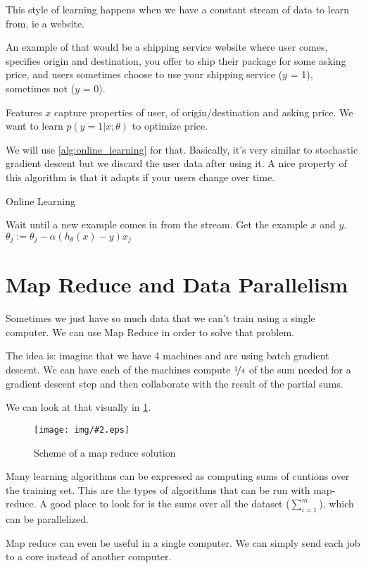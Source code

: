\documentclass[10pt]{extarticle}
\newcommand{\stdfig}[3]{
    \begin{figure}
    \centering
    \texttt{[image: img/\#2.eps]}
    \caption{#3}
    \label{fig:#2}
    \end{figure}
}
\begin{document}
This style of learning happens when we have a constant stream of data to
learn from, ie a website.

An example of that would be a shipping service website where user comes,
specifies origin and destination, you offer to ship their package for
some asking price, and users sometimes choose to use your shipping
service ($y$ = 1), sometimes not ($y$ = 0).

Features $x$ capture properties of user, of origin/destination and
asking price. We want to learn $p(y=1|x;\theta)$ to optimize price.
\smallskip

We will use \cref{alg:online_learning} for that. Basically, it's very
similar to stochastic gradient descent but we discard the user data
after using it. A nice property of this algorithm is that it adapts if
your users change over time.

\begin{algorithm}
    \caption{Online Learning}
    \label{alg:online_learning}
\begin{algorithmic}[1]
    \State Wait until a new example comes in from the stream.
    \State Get the example $x$ and $y$.
      
        \State $\theta_j := \theta_j - \alpha (h_\theta(x) - y) x_j$
    \EndFor
\EndWhile
\end{algorithmic}
\end{algorithm}

\section{Map Reduce and Data
Parallelism}\label{map-reduce-and-data-parallelism}

Sometimes we just have so much data that we can't train using a single
computer. We can use Map Reduce in order to solve that problem.
\smallskip

The idea is: imagine that we have 4 machines and are using batch
gradient descent. We can have each of the machines compute
$\nicefrac{1}{4}$ of the sum needed for a gradient descent step and then
collaborate with the result of the partial sums.

We can look at that visually in \cref{fig:map_reduce_scheme}. \smallskip

\stdfig{10cm}{map_reduce_scheme}{Scheme of a map reduce solution}

Many learning algorithms can be expressed as computing sums of cuntions
over the training set. This are the types of algorithms that can be run
with map-reduce. A good place to look for is the sums over all the
dataset ($\sum_{i=1}^m$), which can be parallelized. \smallskip

Map reduce can even be useful in a single computer. We can simply send
each job to a core instead of another computer.




\clearpage



    \nocite{*}



\end{document}
